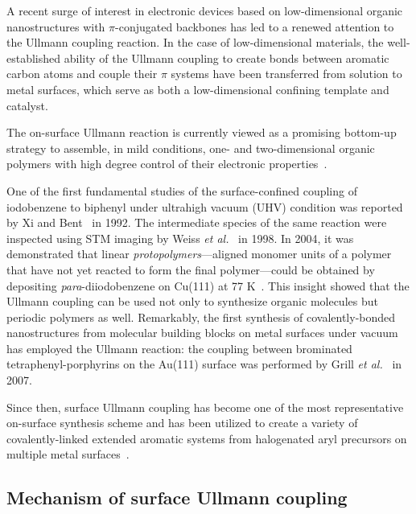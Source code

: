 \documentclass[%
 reprint,
 amsmath,amssymb,
 aps,
prb,
]{revtex4-2}
\begin{document}
A recent surge of interest in electronic devices based on low-dimensional organic nanostructures with $\pi$-conjugated backbones has led to a renewed attention to the Ullmann coupling reaction. 
In the case of low-dimensional materials, the well-established ability of the Ullmann coupling to create bonds between aromatic carbon atoms and couple their $\pi$ systems have been transferred from solution to metal surfaces, which serve as both a low-dimensional confining template and catalyst.

The on-surface Ullmann reaction is currently viewed as a promising bottom-up strategy to assemble, in mild conditions, one- and two-dimensional organic polymers with high degree control of their electronic properties~\cite{ullmann_33}. 

One of the first fundamental studies of the surface-confined coupling of iodobenzene to biphenyl under ultrahigh vacuum (UHV) condition was reported by Xi and Bent~\cite{sur_sci01} in 1992.
%
The intermediate species of the same reaction were inspected using STM imaging by Weiss \textit{et al.}~\cite{langm01} in 1998. 
In 2004, it was demonstrated that linear \emph{protopolymers}---aligned monomer units of a polymer that have not yet reacted to form the final polymer---could be obtained by depositing \textit{para}-diiodobenzene on Cu(111) at 77 K~\cite{jacs01}. 
This insight showed that the Ullmann coupling can be used not only to synthesize organic molecules but periodic polymers as well.
Remarkably, the first synthesis of covalently-bonded nanostructures from molecular building blocks on metal surfaces under vacuum has employed the Ullmann reaction: the coupling between brominated tetraphenyl-porphyrins on the Au(111) surface was performed by Grill \textit{et al.}~\cite{Naturenano2007} in 2007.

Since then, surface Ullmann coupling has become one of the most representative on-surface synthesis scheme and has been utilized to create a variety of covalently-linked extended aromatic systems from halogenated aryl precursors on multiple metal surfaces~\cite{ullmann_33,ullmann_34, ullmann_42, ullmann_43, ullmann_45, ullmann_46, ullmann_47, ullmann_48}. 


\subsection{Mechanism of surface Ullmann coupling}
\end{document}
